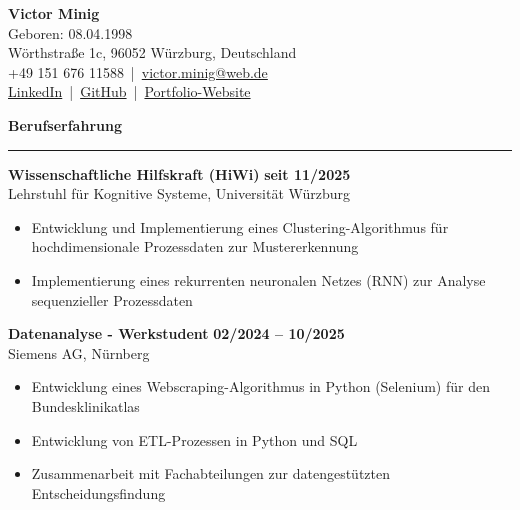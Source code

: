 \documentclass[11pt,a4paper]{article}
\newcommand{\sectiontitle}[1]{
    {\large \textbf{#1}} \vspace{0.2cm} \hrule \vspace{0.5cm}
}
\begin{document}
{\Large \textbf{Victor Minig}} \\
\vspace{0.2cm}
\small
Geboren: 08.04.1998 \\
Wörthstraße 1c, 96052 Würzburg, Deutschland \\
+49 151 676 11588 \,|\, \href{mailto:victor.minig@web.de}{victor.minig@web.de} \\
\href{https://www.linkedin.com/in/victor-minig}{LinkedIn} \,|\, \href{https://github.com/}{GitHub} \,|\, \href{https://rickcler.github.io/VictorMinig.github.io/}{Portfolio-Website}

\vspace{1cm}


\vspace{0.5cm}

\sectiontitle{Berufserfahrung}

\textbf{Wissenschaftliche Hilfskraft (HiWi)} \hfill \textbf{seit 11/2025} \\
Lehrstuhl für Kognitive Systeme, Universität Würzburg \\
\vspace{0.1cm}
\begin{itemize}[leftmargin=*, noitemsep, topsep=0pt]
\item Entwicklung und Implementierung eines Clustering-Algorithmus für hochdimensionale Prozessdaten zur Mustererkennung
\item Implementierung eines rekurrenten neuronalen Netzes (RNN) zur Analyse sequenzieller Prozessdaten
\end{itemize}
\vspace{0.3cm}

\textbf{Datenanalyse - Werkstudent} \hfill \textbf{02/2024 – 10/2025} \\
Siemens AG, Nürnberg  \\
\vspace{0.1cm}
\begin{itemize}[leftmargin=*, noitemsep, topsep=0pt]
\item Entwicklung eines Webscraping-Algorithmus in Python (Selenium) für den Bundesklinikatlas
\item Entwicklung von ETL-Prozessen in Python und SQL
\item Zusammenarbeit mit Fachabteilungen zur datengestützten Entscheidungsfindung
\end{itemize}
\vspace{0.3cm}
\end{document}

